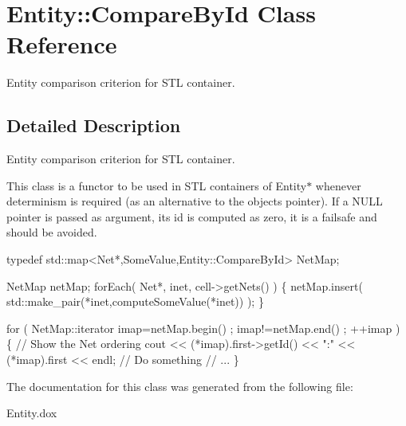 \hypertarget{classEntity_1_1CompareById}{}\section{Entity\+:\+:Compare\+By\+Id Class Reference}
\label{classEntity_1_1CompareById}


Entity comparison criterion for S\+TL container.  




\subsection{Detailed Description}
Entity comparison criterion for S\+TL container. 

This class is a functor to be used in S\+TL containers of {\ttfamily Entity$\ast$} whenever determinism is required (as an alternative to the object\textquotesingle{}s pointer). If a {\ttfamily N\+U\+LL} pointer is passed as argument, it\textquotesingle{}s {\ttfamily id} is computed as zero, it is a failsafe and should be avoided.


\begin{DoxyCode}
\textcolor{keyword}{typedef}  std::map<Net*,SomeValue,Entity::CompareById>  NetMap;

NetMap  netMap;
forEach( Net*, inet, cell->getNets() ) \{
  netMap.insert( std::make\_pair(*inet,computeSomeValue(*inet)) );
\}

\textcolor{keywordflow}{for} ( NetMap::iterator imap=netMap.begin() ; imap!=netMap.end() ; ++imap ) \{
  \textcolor{comment}{// Show the Net ordering}
  cout << (*imap).first->getId() << \textcolor{stringliteral}{":"} << (*imap).first << endl;
  \textcolor{comment}{// Do something}
  \textcolor{comment}{// ...}
\}
\end{DoxyCode}
 

The documentation for this class was generated from the following file\+:\begin{DoxyCompactItemize}
\item 
Entity.\+dox\end{DoxyCompactItemize}
